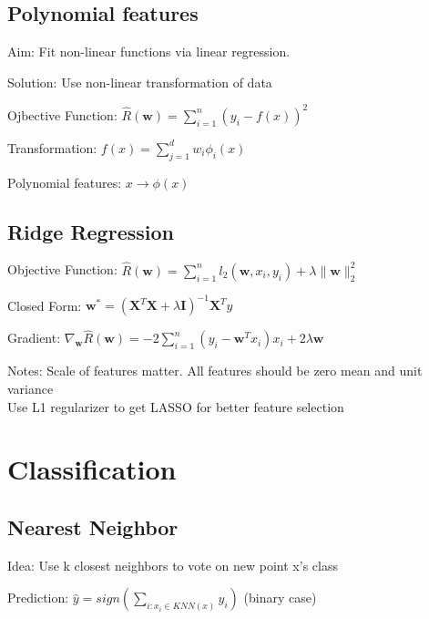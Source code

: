 \documentclass[a4paper, 11pt, landscape]{article}
\begin{document}
\begin{multicols*}{3}
		\subsection{Polynomial features}
		\begin{compactdesc}
			\item[Aim:]Fit non-linear functions via linear regression.
			\item[Solution:]Use non-linear transformation of data
			\item[Ojbective Function:] $\hat{R}(\mathbf{w}) = \sum_{i=1}^{n}(y_i - f(x))^2$
			\item[Transformation:]$f(x) = \sum_{j=1}^{d}w_i\phi_i(x)$
			\item[Polynomial features:]$x \rightarrow \phi(x)$
			
		\end{compactdesc}
		\subsection{Ridge Regression}
		\begin{compactdesc}
			\item[Objective Function:] $\hat{R}(\mathbf{w}) = \sum_{i=1}^{n}l_2(\mathbf{w}, x_i, y_i) + \lambda\|\mathbf{w}\|_2^2$
			\item[Closed Form:] $\mathbf{w^*} = (\mathbf{X}^T\mathbf{X} + \lambda\mathbf{I})^{-1}\mathbf{X}^Ty$
			\item[Gradient:] $\nabla_\mathbf{w} \hat{R}(\mathbf{w}) = -2 \sum_{i=1}^{n}(y_i - \mathbf{w}^Tx_i)x_i + 2\lambda\mathbf{w}$
			\item[Notes:] Scale of features matter. All features should be zero mean and unit variance\\ Use L1 regularizer to get LASSO for better feature selection
		\end{compactdesc}
	
		\section{Classification}
		\subsection{Nearest Neighbor}
		\begin{compactdesc}
			\item[Idea:] Use k closest neighbors to vote on new point x's class
			\item[Prediction:] $\hat{y} = sign(\sum_{i:x_i \in KNN(x)}^{}y_i)$ (binary case)
		\end{compactdesc}

\end{multicols*}
\end{document}
